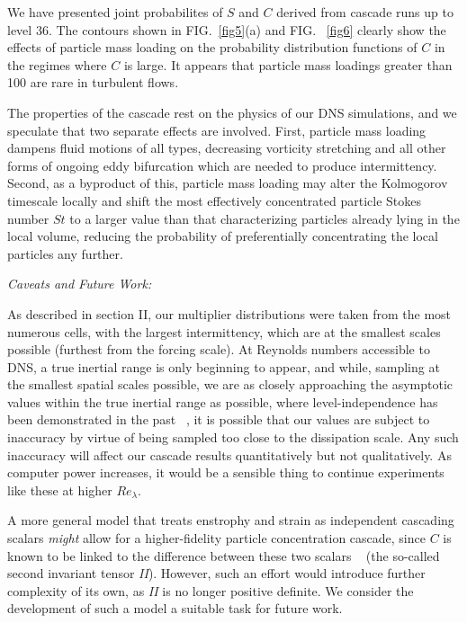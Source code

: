 \documentclass[aps,pra,twocolumn,groupedaddress,showkeys,showpacs,floatfix]{revtex4}
\begin{document}
We have presented joint probabilites of $S$ and $C$ derived
from cascade runs up to level 36. The contours shown in FIG.~\ref{fig5}(a) 
 and FIG. ~\ref{fig6} clearly show
the effects of particle mass loading on the probability distribution
functions of $C$ in the regimes where $C$ is large. It appears that particle
mass loadings greater than 100 are rare in turbulent flows.

The properties of the cascade rest on the physics of our DNS simulations, and we speculate that
two separate effects are involved. First, particle mass loading dampens fluid
motions of all types, decreasing vorticity stretching and all other forms of
ongoing eddy bifurcation which are needed to produce intermittency. Second, as
a byproduct of this, particle mass loading may alter the Kolmogorov timescale
locally and shift the most effectively concentrated particle Stokes number $St$
to a larger value than that characterizing particles already lying in the local
volume, reducing the probability of preferentially concentrating the local
particles any further.

{\it Caveats and Future Work:}

As described in section II, our multiplier distributions were taken from the 
most numerous cells, with the largest intermittency, which are at the smallest 
scales possible (furthest from the forcing scale). At Reynolds numbers 
accessible to DNS, a true inertial range is only beginning to appear, and 
while, sampling at the smallest spatial scales possible, we are 
as closely approaching the asymptotic values within the true inertial range as 
possible, where level-independence has been demonstrated in the past ~\cite{Sreenivasan:1}, it
is possible that our values are subject to inaccuracy by virtue of being 
sampled too close to the dissipation scale. Any such inaccuracy will affect our 
cascade results quantitatively but not qualitatively. As computer power 
increases, it would be a sensible thing to continue experiments like these at 
higher $Re_{\lambda}$. 

A more general model that treats enstrophy and strain as independent cascading 
scalars {\it might} allow for a higher-fidelity particle concentration cascade, 
since $C$ is known to be linked to the difference between these two scalars 
~\cite{Maxey:1} (the so-called second invariant tensor {\it II}). However, such an effort 
would introduce further complexity of its own, as {\it II} is no longer 
positive definite. We consider the development of such a model a suitable task 
for future work. 
\end{document}
